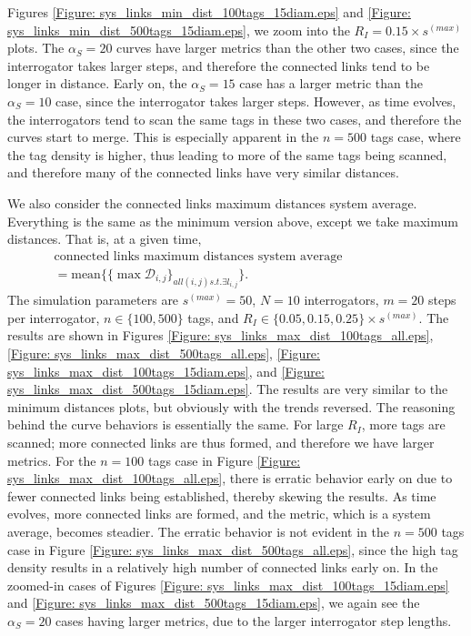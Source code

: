 Figures \ref{Figure: sys_links_min_dist_100tags_15diam.eps} and \ref{Figure: sys_links_min_dist_500tags_15diam.eps}, we zoom into the $R_I = 0.15 \times s^{(max)}$ plots. The $\alpha_S = 20$ curves have larger metrics than the other two cases, since the interrogator takes larger steps, and therefore the connected links tend to be longer in distance. Early on, the $\alpha_S = 15$ case has a larger metric than the $\alpha_S = 10$ case, since the interrogator takes larger steps. However, as time evolves, the interrogators tend to scan the same tags in these two cases, and therefore the curves start to merge. This is especially apparent in the $n = 500$ tags case, where the tag density is higher, thus leading to more of the same tags being scanned, and therefore many of the connected links have very similar distances.

We also consider the connected links maximum distances system average. Everything is the same as the minimum version above, except we take maximum distances. That is, at a given time,
\begin{eqnarray}
\mbox{connected links maximum distances system average} \hspace{1in} \nonumber \\
= \mbox{mean} \{ \{\max \mathcal{D}_{i,j}\}_{all \left(i,j\right) s.t. \exists l_{i,j}} \}.
\end{eqnarray}
The simulation parameters are $s^{(max)} = 50$, $N = 10$ interrogators, $m = 20$ steps per interrogator, $n \in \{100, 500\}$ tags, and $R_I \in \{0.05, 0.15, 0.25\} \times s^{(max)}$. The results are shown in Figures \ref{Figure: sys_links_max_dist_100tags_all.eps}, \ref{Figure: sys_links_max_dist_500tags_all.eps}, \ref{Figure: sys_links_max_dist_100tags_15diam.eps}, and \ref{Figure: sys_links_max_dist_500tags_15diam.eps}. The results are very similar to the minimum distances plots, but obviously with the trends reversed. The reasoning behind the curve behaviors is essentially the same. For large $R_I$, more tags are scanned; more connected links are thus formed, and therefore we have larger metrics. For the $n = 100$ tags case in Figure \ref{Figure: sys_links_max_dist_100tags_all.eps}, there is erratic behavior early on due to fewer connected links being established, thereby skewing the results. As time evolves, more connected links are formed, and the metric, which is a system average, becomes steadier. The erratic behavior is not evident in the $n = 500$ tags case in Figure \ref{Figure: sys_links_max_dist_500tags_all.eps}, since the high tag density results in a relatively high number of connected links early on. In the zoomed-in cases of Figures \ref{Figure: sys_links_max_dist_100tags_15diam.eps} and \ref{Figure: sys_links_max_dist_500tags_15diam.eps}, we again see the $\alpha_S = 20$ cases having larger metrics, due to the larger interrogator step lengths.

